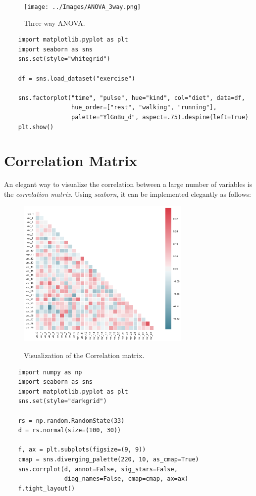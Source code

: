 \begin{figure}
  \centering
  \texttt{[image: ../Images/ANOVA\_3way.png]}\\
  \caption{Three-way ANOVA.}\label{fig:ANOVA3way}
\end{figure}

\begin{lstlisting}
    import matplotlib.pyplot as plt
    import seaborn as sns
    sns.set(style="whitegrid")

    df = sns.load_dataset("exercise")

    sns.factorplot("time", "pulse", hue="kind", col="diet", data=df,
                   hue_order=["rest", "walking", "running"],
                   palette="YlGnBu_d", aspect=.75).despine(left=True)
    plt.show()
\end{lstlisting}

\section{Correlation Matrix}

An elegant way to visualize the correlation between a large number of variables is the \emph{correlation matrix}. Using \emph{seaborn}, it can be implemented elegantly as follows:

\begin{figure}
  \centering
  \includegraphics[width=0.75\textwidth]{../Images/many_pairwise_correlations.png}\\
  \caption{Visualization of the Correlation matrix.}\label{fig:CorrelationMatrix}
\end{figure}

\begin{lstlisting}
    import numpy as np
    import seaborn as sns
    import matplotlib.pyplot as plt
    sns.set(style="darkgrid")

    rs = np.random.RandomState(33)
    d = rs.normal(size=(100, 30))

    f, ax = plt.subplots(figsize=(9, 9))
    cmap = sns.diverging_palette(220, 10, as_cmap=True)
    sns.corrplot(d, annot=False, sig_stars=False,
                 diag_names=False, cmap=cmap, ax=ax)
    f.tight_layout()
\end{lstlisting}


